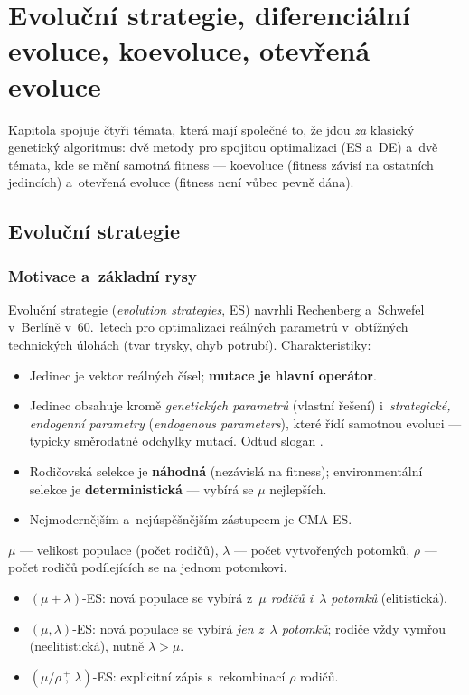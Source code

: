 \documentclass[11pt,a4paper]{article}
\theoremstyle{definition}
\begin{document}
\section{Evoluční strategie, diferenciální evoluce, koevoluce, otevřená evoluce}
\label{sec:es}

Kapitola spojuje čtyři témata, která mají společné to, že jdou \emph{za} klasický genetický
algoritmus: dvě metody pro spojitou optimalizaci (ES a~DE) a~dvě témata, kde se mění samotná
fitness --- koevoluce (fitness závisí na ostatních jedincích) a~otevřená evoluce (fitness
není vůbec pevně dána).

\subsection{Evoluční strategie}
\label{ssec:es}
\subsubsection{Motivace a~základní rysy}

Evoluční strategie (\emph{evolution strategies}, ES) navrhli Rechenberg
a~Schwefel v~Berlíně v~60.\ letech pro optimalizaci reálných parametrů
v~obtížných technických úlohách (tvar trysky, ohyb potrubí). Charakteristiky:

\begin{itemize}
\item Jedinec je vektor reálných čísel; \textbf{mutace je hlavní operátor}.
\item Jedinec obsahuje kromě \emph{genetických parametrů} (vlastní řešení)
  i~\emph{strategické, endogenní parametry} (\emph{endogenous parameters}),
  které řídí samotnou evoluci --- typicky směrodatné odchylky mutací.
  Odtud slogan .
\item Rodičovská selekce je \textbf{náhodná} (nezávislá na fitness);
  environmentální selekce je \textbf{deterministická} --- vybírá se
  $\mu$ nejlepších.
\item Nejmodernějším a~nejúspěšnějším zástupcem je CMA-ES.
\end{itemize}

\begin{defbox}[Notace ES]
$\mu$ --- velikost populace (počet rodičů), $\lambda$ --- počet vytvořených
potomků, $\rho$ --- počet rodičů podílejících se na jednom potomkovi.
\begin{itemize}
\item $(\mu + \lambda)$-ES: nová populace se vybírá z~\emph{$\mu$ rodičů
  i~$\lambda$ potomků} (elitistická).
\item $(\mu, \lambda)$-ES: nová populace se vybírá \emph{jen z~$\lambda$
  potomků}; rodiče vždy vymřou (neelitistická), nutně $\lambda > \mu$.
\item $(\mu/\rho \,\overset{+}{,}\, \lambda)$-ES: explicitní zápis
  s~rekombinací $\rho$ rodičů.
\end{itemize}
\end{defbox}
\end{document}

